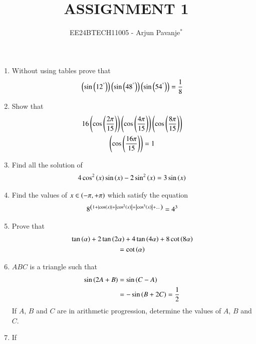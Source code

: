 \documentclass[journal,12pt,article,twocolumn]{IEEEtran}
\theoremstyle{remark}
\begin{document}

\vspace{3cm}

\title{ASSIGNMENT 1}
\author{EE24BTECH11005 - Arjun Pavanje$^{*}$%
}
\maketitle
\newpage
\bigskip
\begin{enumerate}
\item Without using tables prove that 
\begin{align*} 
\left(\sin\left(12^{\degree}\right)\right)\left(\sin\left(48^{\degree}\right)\right)\left(\sin\left(54^{\degree}\right)\right)= \frac{1}{8}
\end{align*}
\hfill {}
\item Show that 
\begin{multline*}
16\left(\cos\left(\frac{2\pi}{15}\right)\right)\left(\cos\left(\frac{4\pi}{15}\right)\right)\left(\cos\left(\frac{8\pi}{15}\right)\right)\\\left(\cos\left(\frac{16\pi}{15}\right)\right)=1
\end{multline*}
\hfill{}
\item Find all the solution of 
\begin{align*}
4\cos^2\left(x\right) \sin \left(x\right) -2\sin^2\left(x\right) = 3\sin \left(x\right)
\end{align*}
\hfill{}
\item Find the values of $x \in \left(-\pi, +\pi\right)$ which satisfy the equation
\begin{align*}
8^{\left(1+\left\vert\cos \left(x\right)\right\vert+\left\vert\cos^2\left(x\right)\right\vert+\left\vert\cos^3\left(x\right)\right\vert+\dots\right)}= 4^3
\end{align*}
\hfill{}
\item Prove that 
\begin{multline*}
\tan \left(\alpha\right)+2\tan \left(2\alpha\right)+4\tan \left(4\alpha\right)+8\cot \left(8\alpha\right)\\=\cot \left(\alpha\right)
\end{multline*}
\hfill{}
\item $ABC$ is a triangle such that 
\begin{align*}
	\sin{\ensuremath{\left(2A+B\right)}}&=\sin{\ensuremath{\left(C-A\right)}}\\&=-\sin{\ensuremath{\left(B+2C\right)}}=\frac{1}{2}
\end{align*}
If $A$, $B$ and $C$ are in arithmetic progression, determine the values of $A$, $B$ and $C$.
\hfill{}
\item If 
\begin{align*}

\end{align*}
\end{enumerate}
\end{document}
